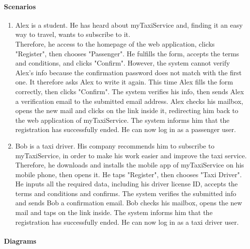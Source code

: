 \paragraph{Scenarios}
\begin{enumerate}
	\item Alex is a student. He has heard about myTaxiService and, finding it an easy way to travel, wants to subscribe to it.\\
	Therefore, he access to the homepage of the web application, clicks "Register", then chooses "Passenger". He fulfills the form, accepts the terms and conditions, and clicks "Confirm". However, the system cannot verify Alex's info because the confirmation password does not match with the first one. It therefore asks Alex to write it again. This time Alex fills the form correctly, then clicks "Confirm". The system verifies his info, then sends Alex a verification email to the submitted email address. Alex checks his mailbox, opens the new mail and clicks on the link inside it, redirecting him back to the web application of myTaxiService. The system informs him that the registration has successfully ended.
	He can now log in as a passenger user.
	
	\item Bob is a taxi driver. His company recommends him to subscribe to myTaxiService, in order to make his work easier and improve the taxi service.\\
	Therefore, he downloads and installs the mobile app of myTaxiService on his mobile phone, then opens it. He taps "Register", then chooses "Taxi Driver". He inputs all the required data, including his driver license ID, accepts the terms and conditions and confirms. The system verifies the submitted info and sends Bob a confirmation email. Bob checks his mailbox, opens the new mail and taps on the link inside. The system informs him that the registration has successfully ended. He can now log in as a taxi driver user.
\end{enumerate}

\paragraph{Diagrams}

